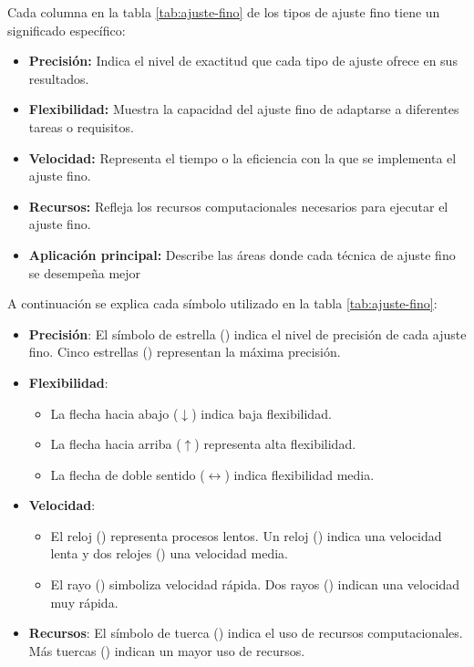 Cada columna en la tabla \ref{tab:ajuste-fino} de los tipos de ajuste fino tiene un significado específico:

\begin{itemize}
	\item \textbf{Precisión: } Indica el nivel de exactitud que cada tipo de ajuste ofrece en sus resultados. 
	\item \textbf{Flexibilidad: } Muestra la capacidad del ajuste fino de adaptarse a diferentes tareas o requisitos.
	\item \textbf{Velocidad: }  Representa el tiempo o la eficiencia con la que se implementa el ajuste fino.
	\item \textbf{Recursos: } Refleja los recursos computacionales necesarios para ejecutar el ajuste fino.
	\item \textbf{Aplicación principal: } Describe las áreas donde cada técnica de ajuste fino se desempeña mejor
\end{itemize}

A continuación se explica cada símbolo utilizado en la tabla \ref{tab:ajuste-fino}:

\begin{itemize}
	\item \textbf{Precisión}: El símbolo de estrella (\starL) indica el nivel de precisión de cada ajuste fino. Cinco estrellas (\starL\starL\starL\starL\starL) representan la máxima precisión. 
	\item \textbf{Flexibilidad}:
	\begin{itemize}
		\item La flecha hacia abajo ($\downarrow$) indica baja flexibilidad.
		\item La flecha hacia arriba ($\uparrow$) representa alta flexibilidad.
		\item La flecha de doble sentido ($\leftrightarrow$) indica flexibilidad media.
	\end{itemize}
	\item \textbf{Velocidad}:
	\begin{itemize}
		\item El reloj (\reloj) representa procesos lentos. Un reloj (\reloj) indica una velocidad lenta y dos relojes (\reloj\reloj) una velocidad media.
		\item El rayo (\rayo) simboliza velocidad rápida. Dos rayos (\rayo\rayo) indican una velocidad muy rápida.
	\end{itemize}
	\item \textbf{Recursos}: El símbolo de tuerca (\monitor) indica el uso de recursos computacionales. Más tuercas (\monitor\monitor\monitor\monitor) indican un mayor uso de recursos.
\end{itemize}

